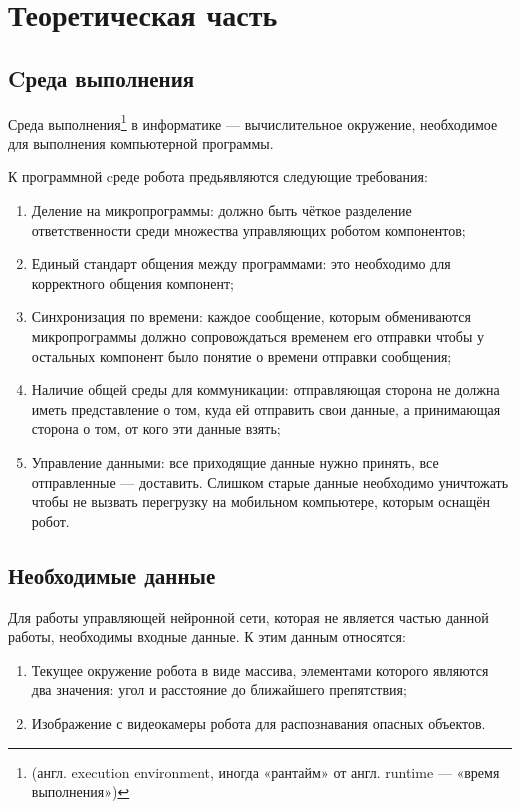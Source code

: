 \chapter{Теоретическая часть}\label{ch:ch1}

\section{Cреда выполнения}\label{sec:ch1/sec1}
Среда выполнения\footnote{(англ. execution environment, иногда «рантайм» от англ. runtime — «время выполнения»)} в информатике — вычислительное окружение, необходимое для выполнения компьютерной программы\cite{runtime}. 

К программной cреде робота предьявляются следующие требования:
\begin{enumerate}[beginpenalty=10000] %
  \item Деление на микропрограммы: должно быть чёткое разделение ответственности среди множества управляющих роботом компонентов;
  \item Единый стандарт общения между программами: это необходимо для корректного общения компонент;
  \item Синхронизация по времени: каждое сообщение, которым обмениваются микропрограммы должно сопровождаться временем его отправки чтобы у остальных компонент было понятие о времени отправки сообщения;
  \item Наличие общей среды для коммуникации: отправляющая сторона не должна иметь представление о том, куда ей отправить свои данные, а принимающая сторона о том, от кого эти данные взять;
  \item Управление данными: все приходящие данные нужно принять, все отправленные --- доставить. Слишком старые данные необходимо уничтожать чтобы не вызвать перегрузку на мобильном компьютере, которым оснащён робот.
\end{enumerate}

\section{Необходимые данные}\label{sec:ch1/sec2}

Для работы управляющей нейронной сети, которая не является частью данной работы, необходимы входные данные. К этим данным относятся:
\begin{enumerate}[beginpenalty=10000] %
  \item Текущее окружение робота в виде массива, элементами которого являются два значения: угол и расстояние до ближайшего препятствия;
  \item Изображение с видеокамеры робота для распознавания опасных объектов.
\end{enumerate}


